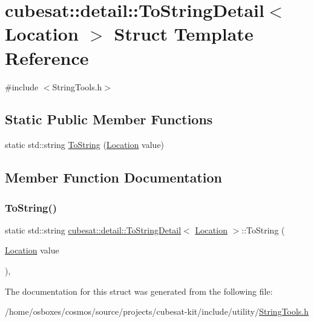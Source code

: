 \hypertarget{structcubesat_1_1detail_1_1ToStringDetail_3_01Location_01_4}{}\section{cubesat\+:\+:detail\+:\+:To\+String\+Detail$<$ Location $>$ Struct Template Reference}
\label{structcubesat_1_1detail_1_1ToStringDetail_3_01Location_01_4}


{\ttfamily \#include $<$String\+Tools.\+h$>$}

\subsection*{Static Public Member Functions}
\begin{DoxyCompactItemize}
\item 
static std\+::string \hyperlink{structcubesat_1_1detail_1_1ToStringDetail_3_01Location_01_4_a7b3e00b854d29033779cbdcbcb106b6d}{To\+String} (\hyperlink{structcubesat_1_1Location}{Location} value)
\end{DoxyCompactItemize}


\subsection{Member Function Documentation}
\mbox{\label{structcubesat_1_1detail_1_1ToStringDetail_3_01Location_01_4_a7b3e00b854d29033779cbdcbcb106b6d}} 
\subsubsection{\texorpdfstring{To\+String()}{ToString()}}
{\footnotesize\ttfamily static std\+::string \hyperlink{structcubesat_1_1detail_1_1ToStringDetail}{cubesat\+::detail\+::\+To\+String\+Detail}$<$ \hyperlink{structcubesat_1_1Location}{Location} $>$\+::To\+String (\begin{DoxyParamCaption}\item[{\hyperlink{structcubesat_1_1Location}{Location}}]{value }\end{DoxyParamCaption})\hspace{0.3cm}{\ttfamily [inline]}, {\ttfamily [static]}}



The documentation for this struct was generated from the following file\+:\begin{DoxyCompactItemize}
\item 
/home/osboxes/cosmos/source/projects/cubesat-\/kit/include/utility/\hyperlink{StringTools_8h}{String\+Tools.\+h}\end{DoxyCompactItemize}

